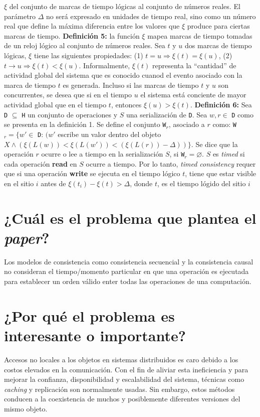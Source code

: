 $\xi$ del conjunto de marcas de tiempo lógicas al conjunto de números reales. El parámetro $\Delta$ no será expresado en unidades de tiempo real, sino como un número real que define la máxima diferencia entre los valores que $\xi$ produce para ciertas marcas de tiempo. \textbf{Definición 5:} la función $\xi$ mapea marcas de tiempo tomadas de un reloj lógico al conjunto de números reales. Sea $t$ y $u$ dos marcas de tiempo lógicas, $\xi$ tiene las siguientes propiedades: (1) $t = u \Rightarrow \xi(t) = \xi(u)$, (2) $t \to u \Rightarrow \xi(t) < \xi(u)$. Informalmente, $\xi(t)$ representa la ``cantidad'' de actividad global del sistema que es conocido cuanod el evento asociado con la marca de tiempo $t$ es generada. Incluso si las marcas de tiempo $t$ y $u$ son concurrentes, se desea que si en el tiempo $u$ el sistema está conciente de mayor actividad global que en el tiempo $t$, entonces $\xi(u) > \xi(t)$. \textbf{Definición 6:} Sea \texttt{D} $\subseteq$ \texttt{H} un conjunto de operaciones y $S$ una serialización de \texttt{D}. Sea $w, r \in$ \texttt{D} como se presenta en la definición 1. Se define el conjunto \texttt{W}$_r$, asociado a $r$ como: \texttt{W}$_r = \{w' \in$ \texttt{D}: $(w'$ escribe un valor dentro del objeto $X \wedge (\xi(L(w)) < \xi(L(w')) < (\xi(L(r)) - \Delta))\}$. Se dice que la operación $r$ ocurre o lee a tiempo en la serialización $S$, si \texttt{W}$_r = \varnothing$. $S$ es \emph{timed} si cada operación \textbf{read} en $S$ ocurre a tiempo. Por lo tanto, \emph{timed consistency} requer que si una operación \textbf{write} se ejecuta en el tiempo lógico $t$, tiene que estar visible en el sitio $i$ antes de $\xi(t_i) - \xi(t) > \Delta$, donde $t$, es el tiempo lógido del sitio $i$
 
\section{¿Cuál es el problema que plantea el \textit{paper}?}
Los modelos de consistencia como consistencia secuencial y la consistencia causal no consideran el tiempo/momento particular en que una operación es ejecutada para establecer un orden válido enter todas las operaciones de una computación.

\section{¿Por qué el problema es interesante o importante?}
Accesos no locales a los objetos en sistemas distribuidos es caro debido a los costos elevados en la comunicación. Con el fin de aliviar esta ineficiencia y para mejorar la confianza, disponibilidad y escalabilidad del sistema, técnicas como \emph{caching} y replicación son normalmente usadas. Sin embargo, estos métodos conducen a la coexistencia de muchos y posiblemente diferentes versiones del mismo objeto.

